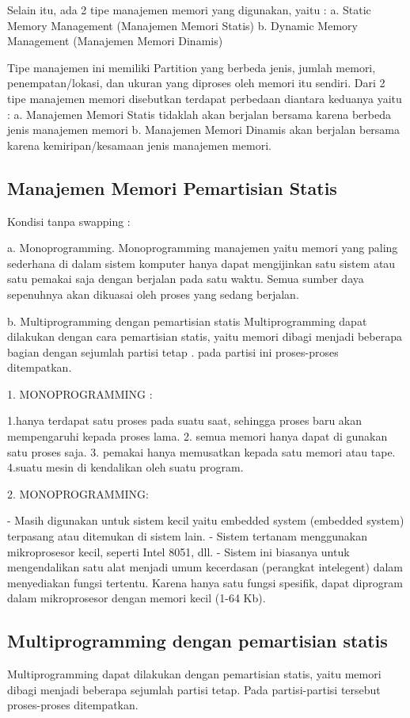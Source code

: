 Selain itu, ada 2 tipe manajemen memori yang digunakan, yaitu :
a. Static Memory Management (Manajemen Memori Statis)
b. Dynamic Memory Management (Manajemen Memori Dinamis)

Tipe manajemen ini memiliki Partition yang berbeda jenis, jumlah memori, penempatan/lokasi, dan ukuran yang diproses
oleh memori itu sendiri. Dari 2 tipe manajemen memori disebutkan terdapat perbedaan diantara keduanya yaitu :
a. Manajemen Memori Statis  tidaklah akan berjalan bersama karena berbeda jenis manajemen memori
b. Manajemen Memori Dinamis akan berjalan bersama karena kemiripan/kesamaan jenis manajemen memori.

\subsection {Manajemen Memori Pemartisian Statis}

Kondisi tanpa swapping :

a. Monoprogramming.
Monoprogramming manajemen yaitu memori yang paling sederhana di dalam sistem komputer hanya dapat mengijinkan satu sistem atau satu pemakai saja dengan berjalan pada satu waktu. Semua sumber daya sepenuhnya akan dikuasai oleh proses yang sedang berjalan.

b. Multiprogramming dengan pemartisian statis
Multiprogramming dapat dilakukan dengan cara pemartisian statis, yaitu memori dibagi menjadi beberapa bagian dengan sejumlah partisi tetap . pada partisi ini proses-proses ditempatkan.

1. MONOPROGRAMMING :

	1.hanya terdapat satu proses pada suatu saat, sehingga proses baru akan mempengaruhi kepada proses lama.
	2. semua memori hanya dapat di gunakan satu proses saja.
	3. pemakai hanya memusatkan kepada satu memori atau tape.
	4.suatu mesin di kendalikan oleh suatu program.

2. MONOPROGRAMMING:

- Masih digunakan untuk sistem kecil yaitu embedded system (embedded system)
terpasang atau ditemukan di sistem lain.
- Sistem tertanam menggunakan mikroprosesor kecil, seperti Intel 8051,
dll.
- Sistem ini biasanya untuk mengendalikan satu alat menjadi umum
kecerdasan (perangkat intelegent) dalam menyediakan fungsi tertentu. Karena
hanya satu fungsi spesifik, dapat diprogram dalam mikroprosesor dengan memori
kecil (1-64 Kb).

\subsection {Multiprogramming dengan pemartisian statis}
Multiprogramming dapat dilakukan dengan pemartisian statis, yaitu memori dibagi menjadi beberapa sejumlah partisi tetap. Pada partisi-partisi tersebut proses-proses ditempatkan.

